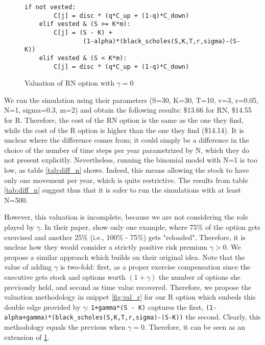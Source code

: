 \begin{figure}[H]
    \begin{lstlisting}[breaklines, basicstyle=\ttfamily\small]
    if not vested:                
        C[j] = disc * (q*C_up + (1-q)*C_down)
    elif vested & (S >= K*m): 
        C[j] = (S - K) + 
                (1-alpha)*(black_scholes(S,K,T,r,sigma)-(S-K))
    elif vested & (S < K*m):
        C[j] = disc * (q*C_up + (1-q)*C_down)
    \end{lstlisting}
    \caption{Valuation of RN option with $\gamma=0$}
    \label{fig:val_r_gamma0}
\end{figure}

 We run the simulation using their parameters (S=30, K=30, T=10, v=3, r=0.05, N=1, sigma=0.3, m=2) and obtain the following results: \$13.66 for RN, \$14.55 for R. Therefore, the cost of the RN option is the same as the one they find, while the cost of the R option is higher than the one they find (\$14.14). It is unclear where the difference comes from; it could simply be a difference in the choice of the number of time steps per year parametrized by N, which they do not present explicitly. Nevertheless, running the binomial model with N=1 is too low, as table \ref*{tab:diff_n} shows. Indeed, this means allowing the stock to have only one movement per year, which is quite restrictive. The results from table \ref*{tab:diff_n} suggest thus that it is safer to run the simulations with at least N=500.

 

However, this valuation is incomplete, because we are not considering the role played by $\gamma$. In their paper, \cite{huang2013dynamic} show only one example, where 75\% of the option gets exercised and another 25\% (i.e., 100\% - 75\%) gets "reloaded". Therefore, it is unclear how they would consider a strictly positive risk premium $\gamma > 0$. 
We propose a similar approach which builds on their original idea. Note that the value of adding $\gamma$ is two-fold: first, as a proper exercise compensation since the executive gets stock and options worth $(1+\gamma)$ the number of options she previously held, and second as time value recovered. Therefore, we propose the valuation methodology in snippet \ref*{fig:val_r} for our R option which embeds this double edge provided by $\gamma$: \verb|1+gamma*(S - K)| captures the first, \verb|(1-alpha+gamma)*(black_scholes(S,K,T,r,sigma)-(S-K))| the second.
Clearly, this methodology equals the previous when $\gamma = 0$. Therefore, it can be seen as an extension of \ref*{fig:val_r_gamma0}.

